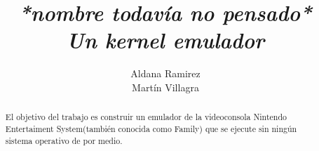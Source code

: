 \documentclass[a4paper,12pt,spanish,notitlepage]{report}
\def\name{\textsl{*nombre todavía no pensado*}}
\begin{document}
\title{\name\\\large\textit{Un kernel emulador}}
\author{Aldana Ramirez\\Martín Villagra}
\maketitle
\vspace{1cm}
\vspace{\fill}
\begin{abstract}\centering
El objetivo del trabajo es construir un emulador de la videoconsola Nintendo Entertaiment System(también conocida como Family) que se ejecute sin ningún sistema operativo de por medio.
\end{abstract}
\raggedright
\tableofcontents


\end{document}
